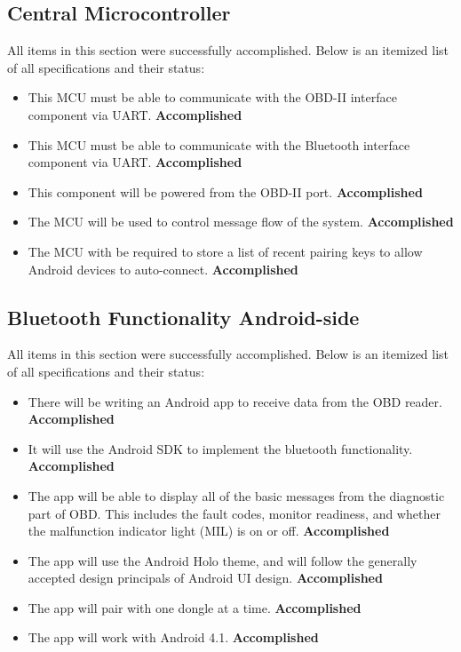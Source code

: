 \documentclass[12pt,letterpaper]{article}
\begin{document}
\subsection{Central Microcontroller}
All items in this section were successfully accomplished. Below is an itemized list of all specifications and their status: 

\begin{itemize}
	\item This MCU must be able to communicate with the OBD-II interface component via UART. \textbf{Accomplished}
	\item This MCU must be able to communicate with the Bluetooth interface component via UART. \textbf{Accomplished}
	\item This component will be powered from the OBD-II port. \textbf{Accomplished}
	\item The MCU will be used to control message flow of the system. \textbf{Accomplished}
	\item The MCU with be required to store a list of recent pairing keys to allow Android devices to auto-connect. \textbf{Accomplished}
\end{itemize} 

\subsection{Bluetooth Functionality Android-side}
All items in this section were successfully accomplished. Below is an itemized list of all specifications and their status:

\begin{itemize}
	\item There will be writing an Android app to receive data from the OBD reader. \textbf{Accomplished}
	\item It will use the Android SDK to implement the bluetooth functionality. \textbf{Accomplished}
	\item The app will be able to display all of the basic messages from the diagnostic part of OBD. This includes the fault codes, monitor readiness, and whether the malfunction indicator light (MIL) is on or off. \textbf{Accomplished}
	\item The app will use the Android Holo theme, and will follow the generally accepted design principals of Android UI design. \textbf{Accomplished}
	\item The app will pair with one dongle at a time. \textbf{Accomplished}
	\item The app will work with Android 4.1. \textbf{Accomplished}

\end{itemize}
\end{document}
